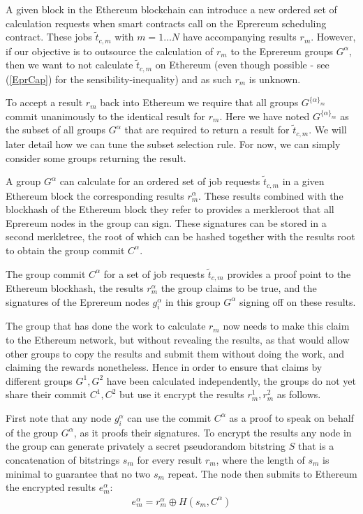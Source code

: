 \documentclass[twocolumn]{article}
\begin{document}
A given block in the Ethereum blockchain can introduce a new ordered set of calculation requests when smart contracts call on the Eprereum scheduling contract.  These jobs $\tilde{t}_{c, m}$ with $m=1\dots N$ have accompanying results $r_m$.  However, if our objective is to outsource the calculation of $r_m$ to the Eprereum groups $G^\alpha$, then we want to not calculate $\tilde{t}_{c,m}$ on Ethereum (even though possible - see (\ref{EprCap}) for the sensibility-inequality) and as such $r_m$ is unknown.

To accept a result $r_m$ back into Ethereum we require that all groups $G^{\{\alpha\}_m}$ commit unanimously to the identical result for $r_m$.  Here we have noted $G^{\{\alpha\}_m}$ as the subset of all groups $G^\alpha$ that are required to return a result for $\tilde{t}_{c,m}$.  We will later detail how we can tune the subset selection rule.  For now, we can simply consider some groups returning the result.

A group $G^\alpha$ can calculate for an ordered set of job requests $\tilde{t}_{c,m}$ in a given Ethereum block the corresponding results $r_m^\alpha$.  These results combined with the blockhash of the Ethereum block they refer to provides a merkleroot that all Eprereum nodes in the group can sign.  These signatures can be stored in a second merkletree, the root of which can be hashed together with the results root to obtain the group commit $C^\alpha$.

The group commit $C^\alpha$ for a set of job requests $\tilde{t}_{c,m}$ provides a proof point to the Ethereum blockhash, the results $r^\alpha_m$ the group claims to be true, and the signatures of the Eprereum nodes $g^\alpha_i$ in this group $G^\alpha$ signing off on these results.

The group that has done the work to calculate $r_m$ now needs to make this claim to the Ethereum network, but without revealing the results, as that would allow other groups to copy the results and submit them without doing the work, and claiming the rewards nonetheless.  Hence in order to ensure that claims by different groups $G^1, G^2$ have been calculated independently, the groups do not yet share their commit $C^1, C^2$ but use it encrypt the results $r^1_m, r^2_m$ as follows.

First note that any node $g^\alpha_i$ can use the commit $C^\alpha$ as a proof to speak on behalf of the group $G^\alpha$, as it proofs their signatures.  To encrypt the results any node in the group can generate privately a secret pseudorandom bitstring $S$ that is a concatenation of bitstrings $s_m$ for every result $r_m$, where the length of $s_m$ is minimal to guarantee that no two $s_m$ repeat.  The node then submits to Ethereum the encrypted results $e_m^\alpha$:
\begin{align}
		e_m^\alpha = r_m^\alpha \oplus H(s_m, C^\alpha)
\end{align}
\end{document}
